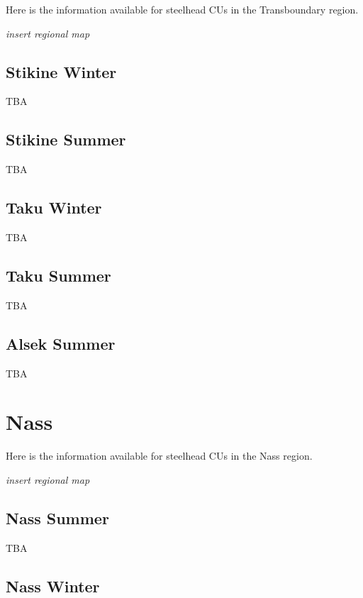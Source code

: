 \documentclass[
]{book}
\begin{document}
Here is the information available for steelhead CUs in the Transboundary region.

\emph{insert regional map}

\hypertarget{stikine-winter}{%
\section{Stikine Winter}\label{stikine-winter}}

TBA

\hypertarget{stikine-summer}{%
\section{Stikine Summer}\label{stikine-summer}}

TBA

\hypertarget{taku-winter}{%
\section{Taku Winter}\label{taku-winter}}

TBA

\hypertarget{taku-summer}{%
\section{Taku Summer}\label{taku-summer}}

TBA

\hypertarget{alsek-summer}{%
\section{Alsek Summer}\label{alsek-summer}}

TBA

\hypertarget{nass}{%
\chapter{Nass}\label{nass}}

Here is the information available for steelhead CUs in the Nass region.

\emph{insert regional map}

\hypertarget{nass-summer}{%
\section{Nass Summer}\label{nass-summer}}

TBA

\hypertarget{nass-winter}{%
\section{Nass Winter}\label{nass-winter}}
\end{document}
